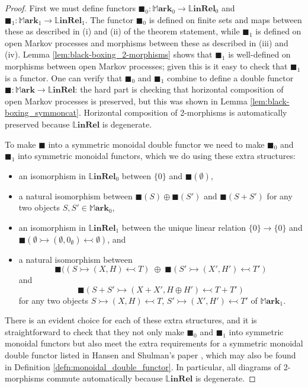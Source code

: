 \documentclass[oneside,final]{ucr}
\theoremstyle{definition}
\newcommand{\maps}{\colon}
\newcommand{\MMark}{\mathbb{M}\mathbf{ark}}
\newcommand{\LLinRel}{\mathbb{L}\mathbf{inRel}}
\begin{document}
{\begin{proof}
First we must define functors $\blacksquare_{0} \maps \MMark_0 \to \LLinRel_0$ and $\blacksquare_1 \maps \MMark_{1} \to \LLinRel_{1}$. The functor $\blacksquare_0$ is defined on finite sets and maps between these as described in (i) and (ii) of the theorem statement, while $\blacksquare_1$ is defined on open Markov processes and morphisms between these as described in (iii) and (iv).  Lemma \ref{lem:black-boxing_2-morphisms} shows that $\blacksquare_1$ is well-defined on morphisms between open Markov processes; given this is it easy to check that $\blacksquare_1$ is a functor.  One can verify that $\blacksquare_0$ and $\blacksquare_1$ combine to define a double functor $\blacksquare \maps \MMark \to \LLinRel$: the hard part is checking that horizontal composition of open Markov processes is preserved, but this was shown in Lemma \ref{lem:black-boxing_symmoncat}.  Horizontal composition of 2-morphisms is automatically preserved because $\LLinRel$ is degenerate.

To make $\blacksquare$ into a symmetric monoidal double functor we need to make
$\blacksquare_0$ and $\blacksquare_1$ into symmetric monoidal functors, which we do using these extra structures:
\begin{itemize}
\item an isomorphism in $\LLinRel_0$ between $\{0\}$ and $\blacksquare(\emptyset)$,
\item a natural isomorphism between $\blacksquare(S)  \oplus \blacksquare(S')$ and 
 $\blacksquare(S + S')$ for any two objects $S,S' \in \MMark_0$,
\item an isomorphism in $\LLinRel_1$ between the unique linear relation $\{0\} \to \{0\}$ and
$\blacksquare(\emptyset \rightarrowtail (\emptyset, 0_\emptyset) \leftarrowtail \emptyset)$, and
\item a natural isomorphism between 
\[
\blacksquare((S \rightarrowtail (X,H) \leftarrowtail T) \; \oplus \; \blacksquare(S' \rightarrowtail (X',H') \leftarrowtail T')  \]
and
\[  \blacksquare(S + S' \rightarrowtail (X+X',H \oplus H') \leftarrowtail T + T') \]
for any two objects $S \rightarrowtail (X,H) \leftarrowtail T$, $S' \rightarrowtail (X',H') \leftarrowtail T'$ of $\MMark_1$.
\end{itemize}
There is an evident choice for each of these extra structures, and it is straightforward to check
that they not only  make $\blacksquare_0$ and $\blacksquare_1$ into symmetric monoidal functors but also meet the extra requirements for a symmetric monoidal double functor listed in Hansen and Shulman's
paper \cite{Shul3}, which may also be found in Definition \ref{defn:monoidal_double_functor}.  In particular, all diagrams of 2-morphisms commute automatically because $\LLinRel$ is degenerate.
\end{proof}

}
\end{document}
